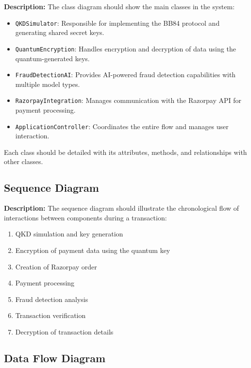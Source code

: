 \documentclass[conference]{IEEEtran}
\begin{document}
\textbf{Description:} The class diagram should show the main classes in the system:
\begin{itemize}
    \item \texttt{QKDSimulator}: Responsible for implementing the BB84 protocol and generating shared secret keys.
    \item \texttt{QuantumEncryption}: Handles encryption and decryption of data using the quantum-generated keys.
    \item \texttt{FraudDetectionAI}: Provides AI-powered fraud detection capabilities with multiple model types.
    \item \texttt{RazorpayIntegration}: Manages communication with the Razorpay API for payment processing.
    \item \texttt{ApplicationController}: Coordinates the entire flow and manages user interaction.
\end{itemize}

Each class should be detailed with its attributes, methods, and relationships with other classes.

\subsection{Sequence Diagram}

\textbf{Description:} The sequence diagram should illustrate the chronological flow of interactions between components during a transaction:
\begin{enumerate}
    \item QKD simulation and key generation
    \item Encryption of payment data using the quantum key
    \item Creation of Razorpay order
    \item Payment processing
    \item Fraud detection analysis
    \item Transaction verification
    \item Decryption of transaction details
\end{enumerate}

\subsection{Data Flow Diagram}
\end{document}
